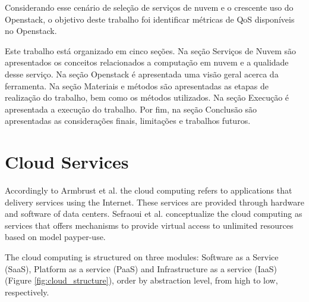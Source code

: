 \documentclass[conference]{IEEEtran}
\begin{document}
Considerando esse cenário de seleção de serviços de nuvem e o crescente uso do Openstack, o objetivo deste trabalho foi identificar
métricas de QoS disponíveis no Openstack.

Este trabalho está organizado em cinco seções. 
Na seção Serviços de Nuvem são apresentados os conceitos relacionados a computação em nuvem e a qualidade desse serviço. 
Na seção Openstack é apresentada uma visão geral acerca da ferramenta.
Na seção Materiais e métodos são apresentadas as etapas de realização do trabalho, bem como os métodos utilizados. 
Na seção Execução é apresentada a execução do trabalho.
Por fim, na seção Conclusão são apresentadas as considerações finais, limitações e trabalhos futuros.


\section{Cloud Services}

Accordingly to Armbrust et al. \cite{armbrust2010view} the cloud computing refers to applications that delivery services 
using the Internet. These services are provided through hardware and software of data centers. Sefraoui et al. conceptualize the 
cloud computing as services that offers mechanisms to provide virtual access to unlimited resources based on model payper-use.


The cloud computing is structured on three modules: Software as a Service (SaaS), Platform as a service (PaaS) and Infrastructure as a service (IaaS) (Figure \ref{fig:cloud_structure}), order by abstraction level, from high to low, respectively. 
\end{document}
